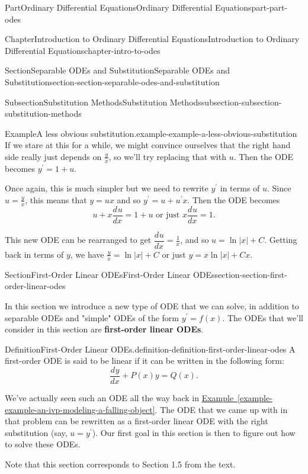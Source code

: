 \documentclass[twoside,10pt,]{book}
\newcommand{\xreffont}{\relax}
\newcommand{\terminology}[1]{\textbf{#1}}
\numberwithin{equation}{part}
\newcommand{\dv}[3][]{\dfrac{d^{#1} #2}{d #3^{#1}}}
\begin{document}
\begin{partptx}{Part}{Ordinary Differential Equations}{}{Ordinary Differential Equations}{}{}{part-part-odes}
\begin{chapterptx}{Chapter}{Introduction to Ordinary Differential Equations}{}{Introduction to Ordinary Differential Equations}{}{}{chapter-intro-to-odes}
\begin{sectionptx}{Section}{Separable ODEs and Substitution}{}{Separable ODEs and Substitution}{}{}{section-section-separable-odes-and-substitution}
\begin{subsectionptx}{Subsection}{Substitution Methods}{}{Substitution Methods}{}{}{subsection-subsection-substitution-methods}
\begin{example}{Example}{A less obvious substitution.}{example-example-a-less-obvious-substitution}
If we stare at this for a while, we might convince ourselves that the right hand side really just depends on \(\frac{y}{x}\), so we'll try replacing that with \(u\). Then the ODE becomes \(y^\prime=1+u\).%
\par
Once again, this is much simpler but we need to rewrite \(y^\prime\) in terms of \(u\). Since \(u=\frac{y}{x}\), this means that \(y=ux\) and so \(y^\prime = u+u^\prime x\). Then the ODE becomes%
\begin{equation*}
u+x\dv{u}{x} = 1+u\text{ or just } x\dv{u}{x} = 1\text{.}
\end{equation*}
%
\par
This new ODE can be rearranged to get \(\dv{u}{x} = \frac{1}{x}\), and so \(u = \ln|x|+C\). Getting back in terms of \(y\), we have \(\frac{y}{x} = \ln|x|+C\) or just \(y = x\ln|x|+Cx\).%
\end{example}
\end{subsectionptx}
\end{sectionptx}
%
%
\typeout{************************************************}
\typeout{************************************************}
%
\begin{sectionptx}{Section}{First-Order Linear ODEs}{}{First-Order Linear ODEs}{}{}{section-section-first-order-linear-odes}
\begin{introduction}{}%
In this section we introduce a new type of ODE that we can solve, in addition to separable ODEs and "simple" ODEs of the form \(y^\prime=f(x)\). The ODEs that we'll consider in this section are \terminology{first-order linear ODEs}.%
\begin{definition}{Definition}{First-Order Linear ODEs.}{definition-definition-first-order-linear-odes}%
%
A first-order ODE is said to be linear if it can be written in the following form:%
\begin{equation*}
\dv{y}{x} + P(x)y = Q(x).
\end{equation*}
%
\end{definition}
We've actually seen such an ODE all the way back in \hyperref[example-example-an-ivp-modeling-a-falling-object]{Example~{\xreffont\ref{example-example-an-ivp-modeling-a-falling-object}}}. The ODE that we came up with in that problem can be rewritten as a first-order linear ODE with the right substitution (say, \(u = y^\prime\)). Our first goal in this section is then to figure out how to solve these ODEs.%
\par
Note that this section corresponds to Section 1.5 from the text.%

\end{introduction}
\end{sectionptx}
\end{chapterptx}
\end{partptx}
\end{document}
